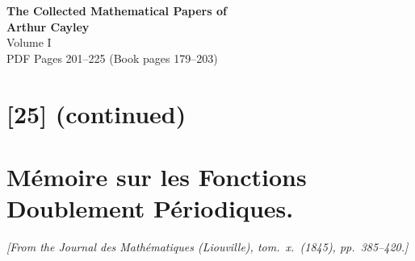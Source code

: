 \documentclass[12pt,a4paper]{article}
\begin{document}

\begin{center}
{\LARGE\bfseries The Collected Mathematical Papers of}\\[0.5em]
{\LARGE\bfseries Arthur Cayley}\\[1em]
{\Large Volume I}\\[1em]
{\large PDF Pages 201--225 \quad (Book pages 179--203)}\\[2em]
\end{center}

\tableofcontents
\newpage

\section*{[25] (continued)}
\section*{M\'emoire sur les Fonctions Doublement P\'eriodiques.}

\textit{[From the Journal des Math\'ematiques (Liouville), tom.~x.~(1845), pp.~385--420.]}

\bigskip
\setcounter{page}{179}
\end{document}

